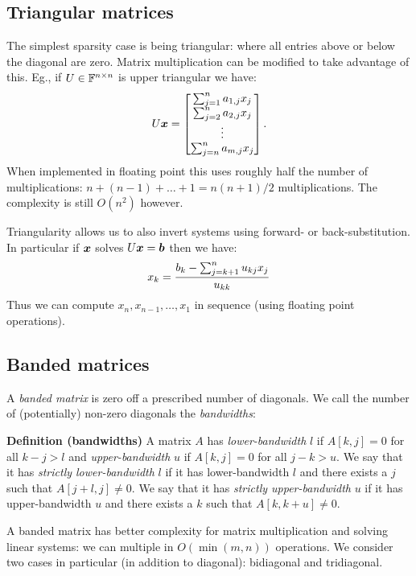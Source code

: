 \subsection{Triangular matrices}
The simplest sparsity case is being triangular: where all entries above or below the diagonal are zero.  Matrix multiplication can be modified to take advantage of this. Eg., if $U \in {\mathbb F}^{n \times n}$ is upper triangular we have:
\[
U\bm{{\mbox{\boldmath$x$\unboldmath}}} = \begin{bmatrix} \sum_{j=1}^n a_{1,j} x_j \\ \sum_{j=2}^n a_{2,j} x_j  \\ \vdots \\ \sum_{j=n}^n a_{m,j} x_j \end{bmatrix}.
\]
When implemented in floating point this uses roughly half the number of multiplications: $n + (n-1) + \ensuremath{\ldots} + 1 = n(n+1)/2$ multiplications. The complexity is still $O(n^2)$ however. 

Triangularity allows us to also invert systems using forward- or back-substitution. In particular if $\bm{{\mbox{\boldmath$x$\unboldmath}}}$ solves $U \bm{{\mbox{\boldmath$x$\unboldmath}}} = \bm{{\mbox{\boldmath$b$\unboldmath}}}$ then we have:
\[
x_k = {b_k - \ensuremath{\sum}_{j=k+1}^n u_{kj} x_j \over u_{kk}}
\]
Thus we can compute $x_n, x_{n-1},\ensuremath{\ldots},x_1$ in sequence (using floating point operations).

\subsection{Banded matrices}
A \emph{banded matrix} is zero off a prescribed number of diagonals.  We call the number of (potentially) non-zero diagonals the \emph{bandwidths}:

\textbf{Definition (bandwidths)} A matrix $A$ has \emph{lower-bandwidth} $l$ if  $A[k,j] = 0$ for all $k-j > l$ and \emph{upper-bandwidth} $u$ if $A[k,j] = 0$ for all $j-k > u$. We say that it has \emph{strictly lower-bandwidth} $l$ if it has lower-bandwidth $l$ and there exists a $j$ such that $A[j+l,j] \neq 0$. We say that it has \emph{strictly upper-bandwidth} $u$ if it has upper-bandwidth $u$ and there exists a $k$ such that $A[k,k+u] \neq 0$.

A banded matrix has better complexity for matrix multiplication and solving linear systems:  we can multiple in $O(\min(m,n))$ operations. We consider two cases in particular (in addition to diagonal): bidiagonal and tridiagonal. 

